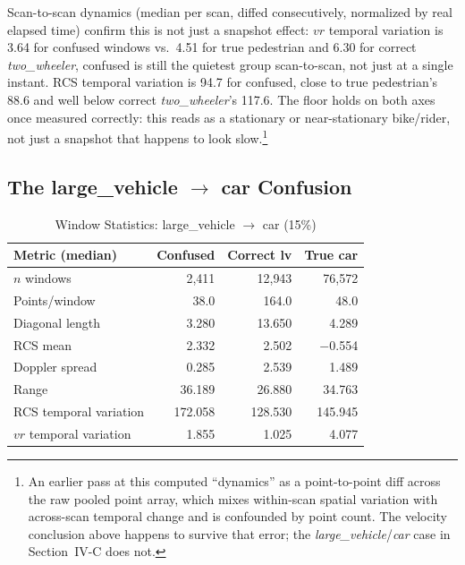 \documentclass[10pt,letterpaper]{IEEEtran}
\begin{document}
Scan-to-scan dynamics (median per scan, diffed consecutively, normalized by
real elapsed time) confirm this is not just a snapshot effect: $vr$ temporal
variation is 3.64 for confused windows vs.\ 4.51 for true pedestrian and 6.30
for correct \emph{two\_wheeler}, confused is still the quietest group
scan-to-scan, not just at a single instant. RCS temporal variation is 94.7
for confused, close to true pedestrian's 88.6 and well below correct
\emph{two\_wheeler}'s 117.6. The floor holds on both axes once measured
correctly: this reads as a stationary or near-stationary
bike/rider, not just a snapshot that happens to look slow.\footnote{An earlier pass at this computed ``dynamics'' as a
point-to-point diff across the raw pooled point array, which mixes
within-scan spatial variation with across-scan temporal change and is
confounded by point count. The velocity conclusion above happens to survive
that error; the \emph{large\_vehicle}/\emph{car} case in
Section~IV-C does not.}

\subsection{The large\_vehicle $\to$ car Confusion}

\begin{table}[t]
  \centering
  \caption{Window Statistics: large\_vehicle $\to$ car (15\%)}
  \label{tab:lv-car}
  \footnotesize
  \begin{tabular}{lrrr}
    \toprule
    Metric (median) & Confused & Correct lv & True car \\
    \midrule
    $n$ windows             & 2{,}411 & 12{,}943 & 76{,}572 \\
    Points/window           & 38.0    & 164.0    & 48.0     \\
    Diagonal length          & 3.280   & 13.650   & 4.289    \\
    RCS mean                & 2.332   & 2.502    & $-$0.554 \\
    Doppler spread           & 0.285   & 2.539    & 1.489    \\
    Range                   & 36.189  & 26.880   & 34.763   \\
    RCS temporal variation   & 172.058 & 128.530  & 145.945  \\
    $vr$ temporal variation  & 1.855   & 1.025    & 4.077    \\
    \bottomrule
  \end{tabular}
\end{table}
\end{document}
